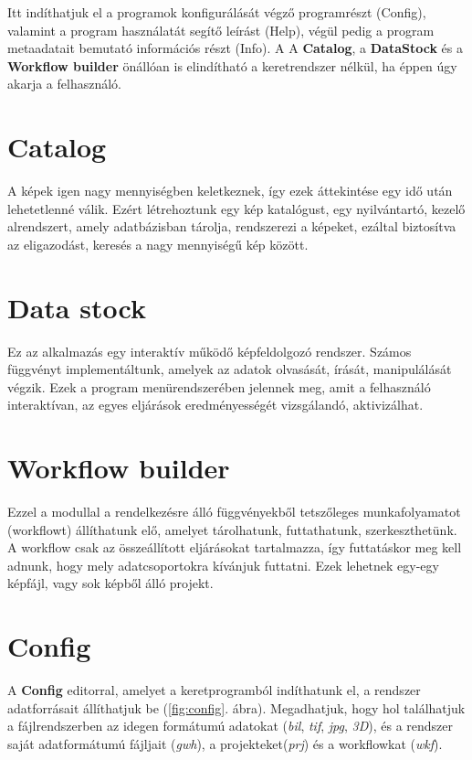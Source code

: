 \documentclass[a4paper,12pt]{book}
\begin{document}
Itt indíthatjuk el a programok konfigurálását végző programrészt (Config), valamint a program használatát segítő leírást (Help), végül pedig a program metaadatait bemutató információs részt (Info).
A A \textbf{Catalog}, a \textbf{DataStock} és a \textbf{Workflow builder} önállóan is elindítható a keretrendszer nélkül, ha éppen úgy akarja a felhasználó.

\section{Catalog}

A képek igen nagy mennyiségben keletkeznek, így ezek áttekintése egy idő után lehetetlenné válik. Ezért létrehoztunk egy kép katalógust, egy nyilvántartó, kezelő alrendszert, amely adatbázisban tárolja, rendszerezi a képeket, ezáltal biztosítva az eligazodást, keresés a nagy mennyiségű kép között.

\section{Data stock}

Ez az alkalmazás egy interaktív működő képfeldolgozó rendszer. Számos függvényt implementáltunk, amelyek az adatok olvasását, írását, manipulálását végzik. Ezek a program menürendszerében jelennek meg, amit a felhasználó interaktívan, az egyes eljárások eredményességét vizsgálandó, aktivizálhat.


\section{Workflow builder}

Ezzel a modullal a rendelkezésre álló függvényekből tetszőleges munkafolyamatot (workflowt) állíthatunk elő, amelyet tárolhatunk, futtathatunk, szerkeszthetünk. A workflow csak az összeállított eljárásokat tartalmazza, így futtatáskor meg kell adnunk, hogy mely adatcsoportokra kívánjuk futtatni. Ezek lehetnek egy-egy képfájl, vagy sok képből álló projekt.


\section{Config}

A \textbf{Config} editorral, amelyet a keretprogramból indíthatunk el, a rendszer adatforrásait állíthatjuk be (\ref{fig:config}. ábra). Megadhatjuk, hogy hol találhatjuk a fájlrendszerben az idegen formátumú adatokat (\textit{bil}, \textit{tif}, \textit{jpg}, \textit{3D}), és a rendszer saját adatformátumú fájljait (\textit{gwh}), a projekteket(\textit{prj}) és a workflowkat (\textit{wkf}). 
 
\end{document}
